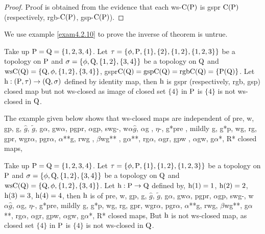 \begin{proof}
Proof is obtained from the evidence that each ws-$\mathrm{C}(\mathrm{P})$ is gspr $\mathrm{C}(\mathrm{P})$ (respectively, rgb-$\mathrm{C}(\mathrm{P})$, gsp-$\mathrm{C}(\mathrm{P})$).
\end{proof}

We use example \ref{exam4.2.10} to prove the inverse of theorem is untrue.

\begin{exm}\label{exam4.2.10} 
Take up $\mathrm{P}=\mathrm{Q}= \{1, 2, 3, 4\}$. Let $\tau= \{\phi, \TSP, \{1\}, \{2\}, \{1, 2\},\break \{1,2,3\}\}$ be a topology on $\mathrm{P}$ and $\sigma=\{\phi, \mathrm{Q}, \{1,2\}, \{3,4 \} \}$ be a topology on $\mathrm{Q}$ and $\mathrm{ws}\mathrm{C}(\mathrm{Q})= \{\mathrm{Q}, \phi, \{1,2\},\{3,4 \}\}$, gspr$\mathrm{C}(\mathrm{Q})=\mathrm{gsp}\mathrm{C}(\mathrm{Q})=\mathrm{rgb}\mathrm{C}(\mathrm{Q})=\{\mathrm{P}(\mathrm{Q})\}$. Let $\mathrm{h}: (\mathrm{P}, \tau) \to (\mathrm{Q},\sigma)$ defined by identity map, then $\mathrm{h}$ is gspr (respectively, rgb, gsp) closed map but not ws-closed as image of closed set $\{4\}$ in $\mathrm{P}$ is $\{4\}$ is not ws-closed in $\mathrm{Q}$.
\end{exm}

\begin{rem}\label{rem4.2.11}
The example given below shows that ws-closed maps are independent of pre, w, gp, g, $\hat{g}$, $\tilde{g}$, g$\alpha$, gw$\alpha$, pgpr, $\alpha$gp, swg-, w$\alpha\hat{g}$, $\alpha$g , $\eta$-, g*pre , mildly g, g*p, wg, rg, gpr, wgr$\alpha$, pgr$\alpha$, $\alpha$**g, rwg , $\beta$wg** , g$\alpha$**, rg$\alpha$, $\alpha$gr, gpw , $\alpha$gw, g$\alpha$*, R* closed maps,
\end{rem}

\begin{exm}\label{exam4.2.12}
Take up $\mathrm{P}=\mathrm{Q}= \{1, 2, 3, 4\}$. Let $\tau= \{\phi, \mathrm{P}, \{1\},\{1, 2\},\{1,2,3\}\}$ be a topology on $\mathrm{P}$ and $\sigma=\{\phi, \mathrm{Q}, \{1,2\}, \{3,4 \}\}$ be a topology on $\mathrm{Q}$ and $\mathrm{ws}\mathrm{C}(\mathrm{Q})= \{\mathrm{Q}, \phi, \{1,2\}, \{3,4 \}\}$. Let $\mathrm{h}: \mathrm{P} \to \mathrm{Q}$ defined by, $\mathrm{h}(1) = 1$, $\mathrm{h}(2) = 2$, $\mathrm{h}(3) = 3$, $\mathrm{h}(4)=4$, then $\mathrm{h}$ is of pre, w, gp, g, $\hat{g}$, $\tilde{g}$, g$\alpha$, gw$\alpha$, pgpr, $\alpha$gp, swg-, w$\alpha\hat{g}$, $\alpha$g, $\eta$-, g*pre, mildly g, g*p, wg, rg, gpr, wgr$\alpha$, pgr$\alpha$, $\alpha$**g, rwg, $\beta$wg**, g$\alpha$**, rg$\alpha$, $\alpha$gr, gpw, $\alpha$gw, g$\alpha$*, R* closed maps, But $\mathrm{h}$ is not ws-closed map, as closed set $\{4\}$ in $\mathrm{P}$ is $\{4\}$ is not ws-closed in $\mathrm{Q}$.
\end{exm}

